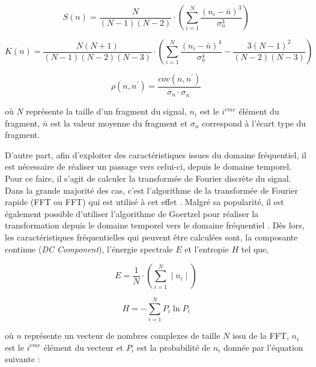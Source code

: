 \begin{equation}
	\label{eq:asymetrie}
	S \left(n\right) = \frac{N}{(N-1)(N-2)} \cdot \left(\sum_{i=1}^{N}{\frac{(n_i-\bar{n})^3}{\sigma_n^3}}\right)
\end{equation}

\begin{equation}
	\label{eq:kurtosis}
	K \left(n\right) = \frac{N(N+1)}{(N-1)(N-2)(N-3)} \cdot \left(\sum_{i=1}^{N}{\frac{(n_i-\bar{n})^4}{\sigma_n^4}-\frac{3(N-1)^2}{(N-2)(N-3)}}\right)
\end{equation}

\begin{equation}
	\label{eq:correlation}
	\rho\left(n, n^{\prime}\right) = \frac{cov\left(n, n^{\prime}\right)}{\sigma_n\cdot\sigma_{n^{\prime}}}
\end{equation}

\noindent où $N$ représente la taille d'un fragment du signal, $n_i$ est le $i^{\grave{e}me}$ élément du fragment, $\bar{n}$ est la valeur moyenne du fragment et $\sigma_n$ correspond à l'écart type du fragment.

D'autre part, afin d'exploiter des caractéristiques issues du domaine fréquentiel, il est nécessaire de réaliser un passage vers celui-ci, depuis le domaine temporel. Pour ce faire, il s'agit de calculer la transformée de Fourier discrète du signal. Dans la grande majorité des cas, c'est l'algorithme de la transformée de Fourier rapide (\acl{FFT} ou \acs{FFT}) qui est utilisé à cet effet \citep{Brigham1967}. Malgré sa popularité, il est également possible d'utiliser l'algorithme de Goertzel pour réaliser la transformation depuis le domaine temporel vers le domaine fréquentiel \citep{Sysel2012}. Dès lors, les caractéristiques fréquentielles qui peuvent être calculées sont, la composante continue (\textit{DC Component}), l'énergie spectrale $E$ et l'entropie $H$ tel que,

\begin{equation}
	\label{eq:energy_spec}
	E = \frac{1}{N}\cdot\left(\sum_{i=1}^{N}\mid{}n_i\mid\right)
\end{equation}

\begin{equation}
	\label{eq:entropy}
	H = - \sum_{i=1}^{N}{P_i}\ln P_i
\end{equation}

\noindent où $n$ représente un vecteur de nombres complexes de taille $N$ issu de la \acs{FFT}, $n_i$ est le $i^{\grave{e}me}$ élément du vecteur et $P_i$ est la probabilité de $n_i$ donnée par l'équation suivante :

